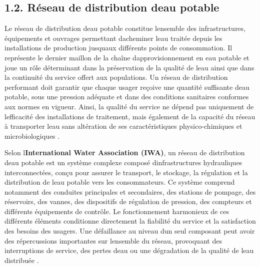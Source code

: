 \documentclass[12pt,a4paper,oneside]{report}
\begin{document}
\subsection{1.2. Réseau de distribution d\textquotesingle eau
potable}\label{ruxe9seau-de-distribution-deau-potable}

Le réseau de distribution d\textquotesingle eau potable constitue
l\textquotesingle ensemble des infrastructures, équipements et ouvrages
permettant d\textquotesingle acheminer l\textquotesingle eau traitée
depuis les installations de production jusqu\textquotesingle aux
différents points de consommation. Il représente le dernier maillon de
la chaîne d\textquotesingle approvisionnement en eau potable et joue un
rôle déterminant dans la préservation de la qualité de
l\textquotesingle eau ainsi que dans la continuité du service offert aux
populations. Un réseau de distribution performant doit garantir que
chaque usager reçoive une quantité suffisante d\textquotesingle eau
potable, sous une pression adéquate et dans des conditions sanitaires
conformes aux normes en vigueur. Ainsi, la qualité du service ne dépend
pas uniquement de l\textquotesingle efficacité des installations de
traitement, mais également de la capacité du réseau à transporter
l\textquotesingle eau sans altération de ses caractéristiques
physico-chimiques et microbiologiques \cite{ref4}.

Selon l\textquotesingle{}\textbf{International Water Association (IWA)},
un réseau de distribution d\textquotesingle eau potable est un système
complexe composé d\textquotesingle infrastructures hydrauliques
interconnectées, conçu pour assurer le transport, le stockage, la
régulation et la distribution de l\textquotesingle eau potable vers les
consommateurs. Ce système comprend notamment des conduites principales
et secondaires, des stations de pompage, des réservoirs, des vannes, des
dispositifs de régulation de pression, des compteurs et différents
équipements de contrôle. Le fonctionnement harmonieux de ces différents
éléments conditionne directement la fiabilité du service et la
satisfaction des besoins des usagers. Une défaillance au niveau
d\textquotesingle un seul composant peut avoir des répercussions
importantes sur l\textquotesingle ensemble du réseau, provoquant des
interruptions de service, des pertes d\textquotesingle eau ou une
dégradation de la qualité de l\textquotesingle eau distribuée \cite{ref11}.
\end{document}

